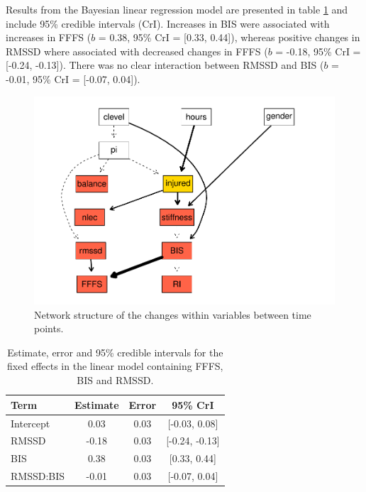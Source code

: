\documentclass[man,floatsintext]{apa6}
\begin{document}
Results from the Bayesian linear regression model are presented in table \ref{tab:bm1} and include 95\% credible intervals (CrI).
Increases in BIS were associated with increases in FFFS (\(b\) = 0.38, 95\% CrI = {[}0.33, 0.44{]}), whereas positive changes in RMSSD where associated with decreased changes in FFFS (\(b\) = -0.18, 95\% CrI = {[}-0.24, -0.13{]}).
There was no clear interaction between RMSSD and BIS (\(b\) = -0.01, 95\% CrI = {[}-0.07, 0.04{]}).

\begin{figure}[H]

{\centering \includegraphics{full_phd_files/figure-latex/changenetwork-1} 

}

\caption{Network structure of the changes within variables between time points.}\label{fig:changenetwork}
\end{figure}

\begin{table}[H]

\begin{center}
\begin{threeparttable}

\caption{\label{tab:bm1}Estimate, error and 95\% credible intervals for the fixed effects in the linear model containing FFFS, BIS and RMSSD.}

\begin{tabular}{lccc}
\toprule
Term & Estimate & Error & 95\% CrI\\
\midrule
Intercept & 0.03 & 0.03 & [-0.03, 0.08]\\
RMSSD & -0.18 & 0.03 & [-0.24, -0.13]\\
BIS & 0.38 & 0.03 & [0.33, 0.44]\\
RMSSD:BIS & -0.01 & 0.03 & [-0.07, 0.04]\\
\bottomrule
\end{tabular}

\end{threeparttable}
\end{center}

\end{table}
\end{document}
